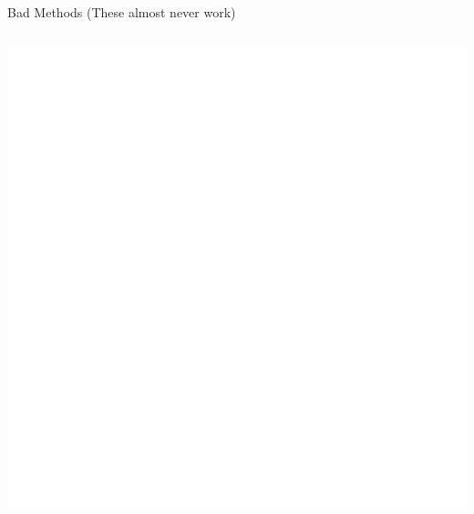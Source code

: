 \documentclass{beamer}\usepackage[]{graphicx}\usepackage[]{color}
\makeatletter
\def\maxwidth{ %
  \ifdim\Gin@nat@width>\linewidth
    \linewidth
  \else
    \Gin@nat@width
  \fi
}
\newenvironment{knitrout}{}{} %
\makeatother
\begin{document}
\begin{frame}{Bad Methods (These almost never work)}
\begin{columns}
\begin{column}{0.5\textwidth}
\begin{knitrout}
{\centering \includegraphics[width=\maxwidth]{figure/intro-unnamed-chunk-23-1} 

}


\end{knitrout}

\end{column}
\end{columns}

\end{frame}

\end{document}
